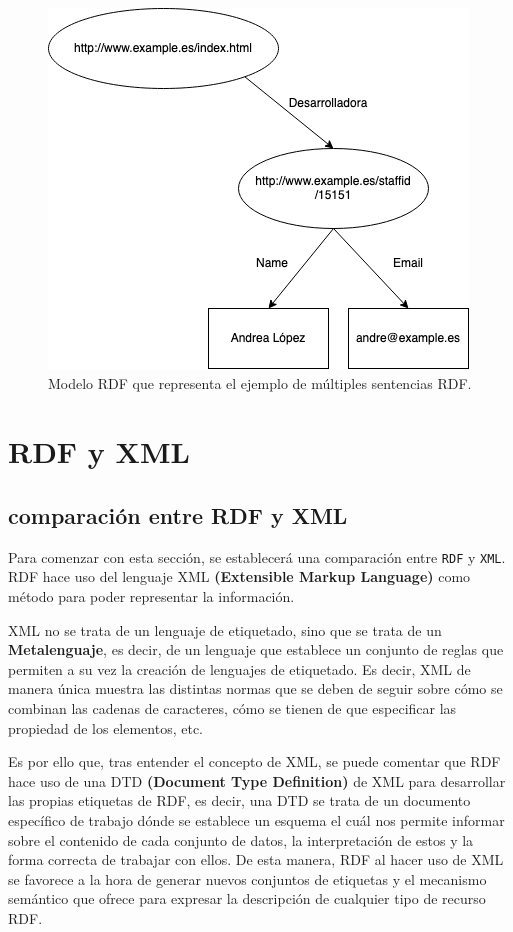 \documentclass[11pt]{report}
\begin{document}
\begin{figure}[H]
	\centering
	\includegraphics[scale=0.7]{../img/Modelo-RDF.png}
	\caption{Modelo RDF que representa el ejemplo de múltiples sentencias RDF.}
	\label{fig:Modelo-RDF}
\end{figure}

	\chapter{RDF y XML}

	\section{comparación entre RDF y XML}

	Para comenzar con esta sección,  se establecerá una comparación entre \texttt{RDF} y \texttt{XML}. RDF hace uso del lenguaje XML \textbf{(Extensible Markup Language)} como método para poder representar la información. 

	XML no se trata de un lenguaje de etiquetado, sino que se trata de un \textbf{Metalenguaje}, es decir, de un lenguaje que establece un conjunto de reglas que permiten a su vez la creación de lenguajes de etiquetado. Es decir, XML de manera única muestra las distintas normas que se deben de seguir sobre cómo se combinan las cadenas de caracteres, cómo se tienen de que especificar las propiedad de los elementos, etc. 

	Es por ello que, tras entender el concepto de XML, se puede comentar que RDF hace uso de una DTD \textbf{(Document Type Definition)} de XML para desarrollar las propias etiquetas de RDF, es decir, una DTD se trata de un documento específico de trabajo dónde se establece un esquema el cuál nos permite informar sobre el contenido de cada conjunto de datos, la interpretación de estos y la forma correcta de trabajar con ellos. De esta manera, RDF al hacer uso de XML se favorece a la hora de generar nuevos conjuntos de etiquetas y el mecanismo semántico que ofrece para expresar la descripción de cualquier tipo de recurso RDF.
\end{document}
